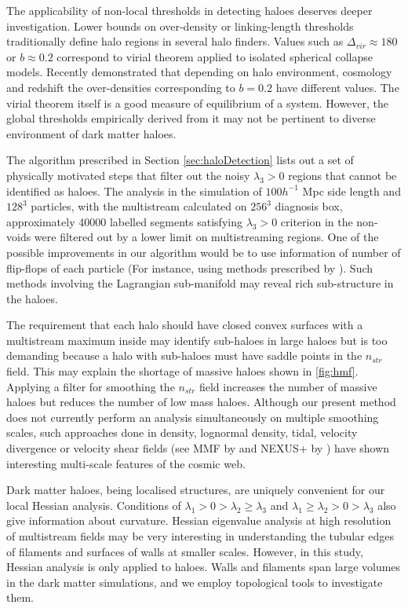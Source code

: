 The applicability of non-local thresholds in detecting haloes deserves deeper investigation. Lower bounds on over-density or linking-length thresholds traditionally define halo regions in several halo finders. Values such as $\Delta_{vir} \approx 180$ or $b \approx 0.2$ correspond to virial theorem applied to isolated spherical collapse models. Recently \cite{More2011} demonstrated that depending on halo environment, cosmology and redshift the over-densities corresponding to $b = 0.2$ have different values. The virial theorem itself is a good measure of equilibrium of a system. However, the global thresholds empirically derived from it may not be pertinent to diverse environment of dark matter haloes. 


The algorithm prescribed in Section \ref{sec:haloDetection} lists out a set of physically motivated steps that filter out the noisy $\lambda_3 > 0$ regions that cannot be identified as haloes. The analysis in the simulation of $100 h^{-1}$ Mpc side length and $128^3$ particles, with the multistream calculated on $256^3$ diagnosis box, approximately 40000 labelled segments satisfying $\lambda_3 > 0$ criterion in the non-voids were filtered out by a lower limit on multistreaming regions. One of the possible improvements in our algorithm would be to use information of number of flip-flops of each particle (For instance, using methods prescribed by \citealt{Shandarin2014a,Shandarin2016}). Such methods involving the Lagrangian sub-manifold may reveal rich sub-structure in the haloes. 

 
The requirement that each halo should have closed convex surfaces with a multistream maximum inside may identify sub-haloes in large haloes but is too demanding because a halo with sub-haloes must have saddle points in the $n_{str}$ field. This may explain the shortage of massive haloes shown in \autoref{fig:hmf}. Applying a filter for smoothing the $n_{str}$ field increases the number of massive haloes but reduces the number of low mass haloes. Although our present method does not currently perform an analysis simultaneously on multiple smoothing scales, such approaches done in density, lognormal density, tidal, velocity divergence or velocity shear fields (see MMF by \citealt{Aragon-Calvo2007} and NEXUS+ by \citealt{Cautun2013}) have shown interesting multi-scale features of the cosmic web. 


Dark matter haloes, being localised structures, are uniquely convenient for our local Hessian analysis. Conditions of $\lambda_1 > 0 > \lambda_2 \geq \lambda_3 $ and $\lambda_1 \geq \lambda_2 > 0 > \lambda_3 $ also give information about curvature. Hessian eigenvalue analysis at high resolution of multistream fields may be very interesting in understanding the tubular edges of filaments and surfaces of walls at smaller scales. However, in this study, Hessian analysis is only applied to haloes. Walls and filaments span large volumes in the dark matter simulations, and we employ topological tools to investigate them. 



